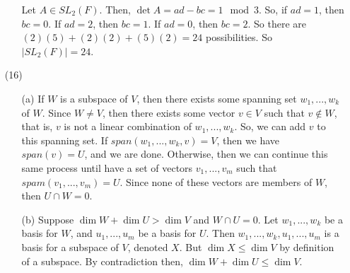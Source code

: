\begin{itemize}
\begin{itemize}
Let $A \in SL_2(F)$. Then, $\det A = ad - bc = 1 \mod 3$. So, if $ad = 1$, then $bc = 0$. If $ad = 2$, then $bc = 1$. If $ad = 0$, then $bc = 2$. So there are $(2)(5) + (2)(2) + (5)(2) = 24$ possibilities. So $|SL_2(F)| = 24$.
\end{itemize}
\item[(16)]
\begin{itemize}
\item[(a)]
If $W$ is a subspace of $V$, then there exists some spanning set $w_1, ..., w_k$ of $W$. Since $W \neq V$, then there exists some vector $v \in V$ such that $v \not \in W$, that is, $v$ is not a linear combination of $w_1, ..., w_k$. So, we can add $v$ to this spanning set. If $span(w_1, ..., w_k, v) = V$, then we have $span(v) = U$, and we are done. Otherwise, then we can continue this same process until have a set of vectors $v_1, ..., v_m$ such that $spam(v_1, ..., v_m) = U$. Since none of these vectors are members of $W$, then $U \cap W = 0$.
\item[(b)]
Suppose $\dim W + \dim U > \dim V$ and $W \cap U = 0$. Let $w_1, ..., w_k$ be a basis for $W$, and $u_1, ..., u_m$ be a basis for $U$. Then $w_1, ..., w_k, u_1, ..., u_m$ is a basis for a subspace of $V$, denoted $X$. But $\dim X \leq \dim V$ by definition of a subspace. By contradiction then, $\dim W + \dim U \leq \dim V$.
\end{itemize}
\end{itemize}
%